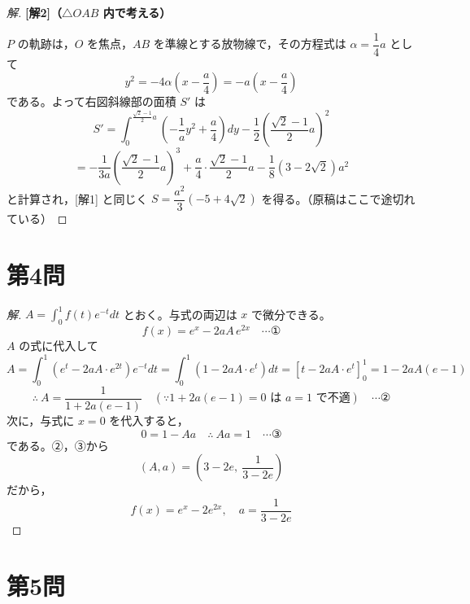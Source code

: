\documentclass[../main.tex]{subfiles}
\begin{document}
\begin{proof}[解]
  \medskip
  \noindent\textbf{[解2]（$\triangle OAB$ 内で考える）}

  $P$ の軌跡は，$O$ を焦点，$AB$ を準線とする放物線で，その方程式は $\alpha=\dfrac14 a$ として
  \[
    y^2=-4\alpha\left(x-\frac{a}{4}\right)=-a\left(x-\frac a4\right)
  \]
  である。よって右図斜線部の面積 $S'$ は
  \[
    S'=\int_0^{\frac{\sqrt2-1}{2}a}\left(-\frac1ay^2+\frac a4\right)dy-\frac12\left(\frac{\sqrt2-1}{2}a\right)^2
  \]
  \[
    =-\frac1{3a}\left(\frac{\sqrt2-1}{2}a\right)^3+\frac a4\cdot\frac{\sqrt2-1}{2}a-\frac18(3-2\sqrt2)a^2
  \]
  と計算され，[解1] と同じく $S=\dfrac{a^2}{3}(-5+4\sqrt2)$ を得る。（原稿はここで途切れている）
\end{proof}

\newpage

\section*{第4問}

\begin{proof}[解]
  $A=\displaystyle\int_0^1 f(t)e^{-t}dt$ とおく。与式の両辺は $x$ で微分できる。
  \[
    f(x)=e^x-2aA\,e^{2x} \quad \cdots \text{①}
  \]
  $A$ の式に代入して
  \[
    A=\int_0^1(e^t-2aA\cdot e^{2t})e^{-t}dt=\int_0^1(1-2aA\cdot e^t)dt=\left[t-2aA\cdot e^t\right]_0^1=1-2aA(e-1)
  \]
  \[
    \therefore\ A=\frac{1}{1+2a(e-1)} \quad (\because 1+2a(e-1)=0\text{ は }a=1\text{ で不適}) \quad \cdots \text{②}
  \]
  次に，与式に $x=0$ を代入すると，
  \[
    0=1-Aa \quad\therefore\ Aa=1 \quad \cdots \text{③}
  \]
  である。②，③から
  \[
    (A,a)=\left(3-2e,\ \frac{1}{3-2e}\right)
  \]
  だから，
  \[
    f(x)=e^x-2e^{2x}, \quad a=\frac{1}{3-2e}
  \]
\end{proof}

\newpage

\section*{第5問}
\end{document}
